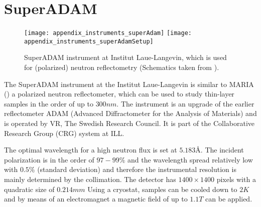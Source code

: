 \documentclass[\main/dresen_thesis.tex]{subfiles}
\begin{document}
  \section{SuperADAM}\label{ch:lss:superadam}
    \begin{figure}[ht]
      \centering
      \texttt{[image: appendix\_instruments\_superAdam]}
      \texttt{[image: appendix\_instruments\_superAdamSetup]}
      \caption{\label{fig:lss:superadam}SuperADAM instrument at Institut Laue-Langevin, which is used for (polarized) neutron reflectometry (Schematics taken from \cite{Devishvili_2015_Super}).}
    \end{figure}
    The SuperADAM instrument at the Institut Laue-Langevin is similar to MARIA () a polarized neutron reflectometer, which can be used to study thin-layer samples in the order of up to $300 \unit{nm}$.
    The instrument is an upgrade of the earlier reflectometer ADAM (Advanced Diffractometer for the Analysis of Materials) and is operated by VR, The Swedish Research Council.
    It is part of the Collaborative Research Group (CRG) system at ILL.

    The optimal wavelength for a high neutron flux is set at $5.183 \unit{\angstrom}$.
    The incident polarization is in the order of $97 - 99 \unit{\%}$ and the wavelength spread relatively low with $0.5 \unit{\%}$ (standard deviation) and therefore the instrumental resolution is mainly determined by the collimation.
    The detector has $1400 \times 1400$ pixels with a quadratic size of $0.214 \unit{mm}$
    Using a cryostat, samples can be cooled down to $2 \unit{K}$ and by means of an electromagnet a magnetic field of up to $1.1 \unit{T}$ can be applied.
\end{document}
